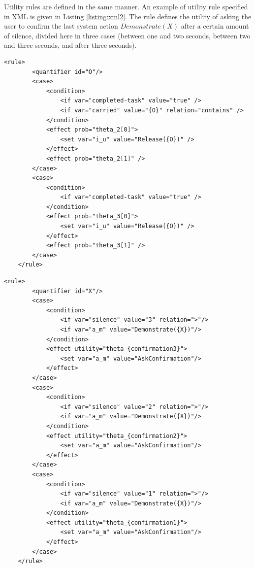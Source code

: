 Utility rules are defined in the same manner.  An example of utility rule specified in XML is given in Listing \ref{listing:xml2}.  The rule defines the utility of asking the user to confirm the last system action $\mathit{Demonstrate}(X)$ after a certain amount of silence, divided here in three cases (between one and two seconds, between two and three seconds, and after three seconds).  

\begin{lstlisting}[label=listing:xml1,caption=Example of probability rule in XML format, float=p,captionpos=b]
    <rule>
        <quantifier id="O"/>
        <case>
            <condition>
                <if var="completed-task" value="true" />
                <if var="carried" value="{O}" relation="contains" />
            </condition>
            <effect prob="theta_2[0]">
                <set var="i_u" value="Release({O})" />
            </effect>
            <effect prob="theta_2[1]" />
        </case>
        <case>
            <condition>
                <if var="completed-task" value="true" />
            </condition>
            <effect prob="theta_3[0]">
                <set var="i_u" value="Release({O})" />
            </effect>
            <effect prob="theta_3[1]" />
        </case>
    </rule>
\end{lstlisting}


\begin{lstlisting}[label=listing:xml2,caption=Example of utility rule in XML format, float=p,captionpos=b]
    <rule>
        <quantifier id="X"/>
        <case>
            <condition>
                <if var="silence" value="3" relation=">"/>
                <if var="a_m" value="Demonstrate({X})"/>
            </condition>
            <effect utility="theta_{confirmation3}">
                <set var="a_m" value="AskConfirmation"/>
            </effect>
        </case>
        <case>
            <condition>
                <if var="silence" value="2" relation=">"/>
                <if var="a_m" value="Demonstrate({X})"/>
            </condition>
            <effect utility="theta_{confirmation2}">
                <set var="a_m" value="AskConfirmation"/>
            </effect>
        </case>
        <case>
            <condition>
                <if var="silence" value="1" relation=">"/>
                <if var="a_m" value="Demonstrate({X})"/>
            </condition>
            <effect utility="theta_{confirmation1}">
                <set var="a_m" value="AskConfirmation"/>
            </effect>
        </case>
    </rule>
\end{lstlisting}

